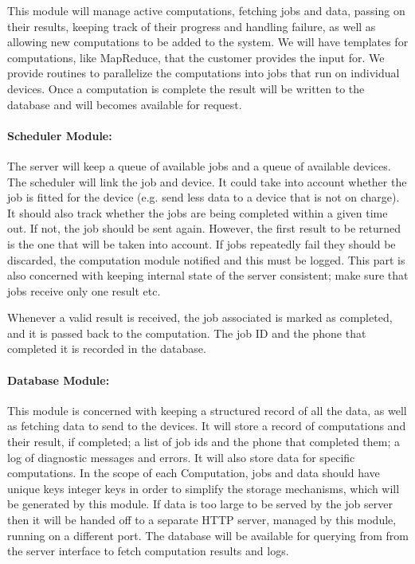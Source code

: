 \documentclass[a4paper,10pt]{article}
\begin{document}
This module will manage active computations, fetching jobs and data, passing on their results, keeping track of their progress and handling failure, as well as allowing new computations to be added to the system.
We will have templates for computations, like MapReduce, that the customer provides the input for. We provide routines to parallelize the computations into jobs that run on individual devices.
Once a computation is complete the result will be written to the database and will becomes available for request.

\paragraph{Scheduler Module:}

The server will keep a queue of available jobs and a queue of available devices. The scheduler will link the job and device. It could take into account whether the job is fitted for the device (e.g. send less data to a device that is not on charge). It should also track whether the jobs are being completed within a given time out. If not, the job should be sent again. However, the first result to be returned is the one that will be taken into account. If jobs repeatedly fail they should be discarded, the computation module notified and this must be logged.
This part is also concerned with keeping internal state of the server consistent; make sure that jobs receive only one result etc.

Whenever a valid result is received, the job associated is marked as completed, and it is passed back to the computation. The job ID and the phone that completed it is recorded in the database.

\paragraph{Database Module:}

This module is concerned with keeping a structured record of all the data, as well as fetching data to send to the devices.
It will store a record of computations and their result, if completed; a list of job ids and the phone that completed them; a log of diagnostic messages and errors. It will also store data for specific computations. In the scope of each Computation, jobs and data should have unique keys integer keys in order to simplify the storage mechanisms, which will be generated by this module.
If data is too large to be served by the job server then it will be handed off to a separate HTTP server, managed by this module, running on a different port.
The database will be available for querying from from the server interface to fetch computation results and logs.
\end{document}
